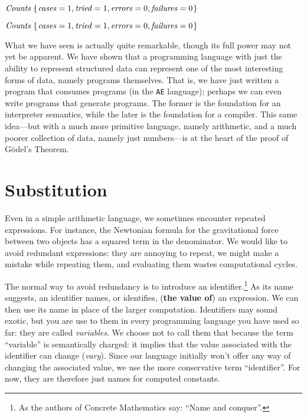 \documentclass{book}
\newcommand{\Conid}[1]{\mathit{#1}}
\newcommand{\Varid}[1]{\mathit{#1}}
\renewcommand{\emph}[1]{{\color{blue}\textit{#1}}}
\begin{document}
\begin{mdframed}[style=default]
\noindent \ensuremath{\Conid{Counts}\;\{\mskip1.5mu \Varid{cases}\mathrel{=}\mathrm{1},\Varid{tried}\mathrel{=}\mathrm{1},\Varid{errors}\mathrel{=}\mathrm{0},\Varid{failures}\mathrel{=}\mathrm{0}\mskip1.5mu\}} 

\noindent \ensuremath{\Conid{Counts}\;\{\mskip1.5mu \Varid{cases}\mathrel{=}\mathrm{1},\Varid{tried}\mathrel{=}\mathrm{1},\Varid{errors}\mathrel{=}\mathrm{0},\Varid{failures}\mathrel{=}\mathrm{0}\mskip1.5mu\}} 
\end{mdframed} 

What we have seen is actually quite remarkable, though its full power may not yet 
be apparent. We have shown that a programming language with just the ability to 
represent structured data can represent one of the most interesting forms of 
data, namely programs themselves. That is, we have just written a program that consumes 
programs (in the \texttt{AE} language); perhaps we can even write programs that 
generate programs. The former is the foundation for an interpreter semantics, while the later 
is the foundation for a compiler. This same idea---but with a much more primitive 
language, namely arithmetic, and a much poorer collection of data, namely 
just numbers---is at the heart of the proof of G\"{o}del's Theorem.  



\section{Substitution} 


Even in a simple arithmetic language, we 
sometimes encounter repeated expressions. 
For instance, the Newtonian formula for the 
gravitational force between two objects has a
squared term in the denominator. We would 
like to avoid redundant expressions: they are 
annoying to repeat, we might make a mistake 
while repeating them, and evaluating them 
wastes computational cycles. 

The normal way to avoid redundancy is to introduce 
an identifier.\footnote{As the authors of Concrete Mathematics 
say: ``Name and conquer''.} As its name suggests, 
an identifier names, or identifies, ({\bf the value of}) 
an expression.  We can then use its name in place of 
the larger computation. Identifiers may sound exotic, 
but you are use to them in every programming language 
you have used so far: they are called \emph{variables}. 
We choose not to call them that because the term
``variable'' is semantically 
charged: it implies that the value associated with the identifier 
can change (\emph{vary}). Since our language initially 
won't offer any way of changing the associated value, 
we use the more conservative term ``identifier''. 
For now, they are therefore just names for computed constants. 
\end{document}
